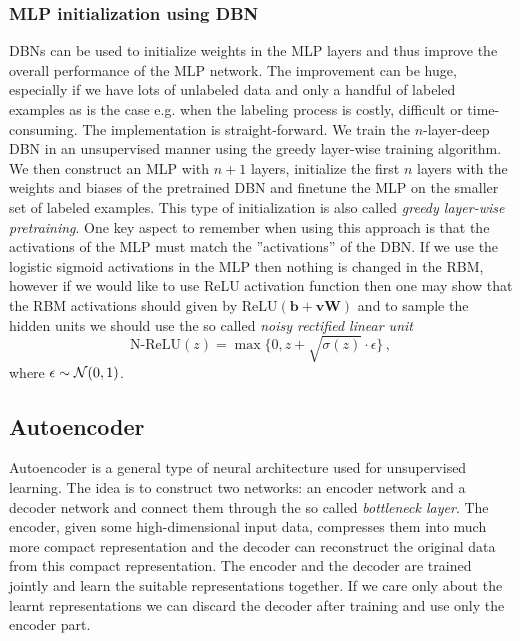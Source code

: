 \documentclass{myclass}
\begin{document}
\subsubsection{MLP initialization using DBN}

DBNs can be used to initialize weights in the MLP layers and thus improve the overall performance of
the MLP network. The improvement can be huge, especially if we have lots of unlabeled data and only
a handful of labeled examples as is the case e.g. when the labeling process is costly, difficult or
time-consuming. The implementation is straight-forward. We train the $n$-layer-deep DBN in an
unsupervised manner using the greedy layer-wise training algorithm. We then construct an MLP with
$n+1$ layers, initialize the first $n$ layers with the weights and biases of the pretrained DBN and
finetune the MLP on the smaller set of labeled examples. This type of initialization is also called
\emph{greedy layer-wise pretraining}. One key aspect to remember when using this approach is that
the activations of the MLP must match the ''activations'' of the DBN. If we use the logistic sigmoid
activations in the MLP then nothing is changed in the RBM, however if we would like to use ReLU
activation function then one may show that the RBM activations should given by $\text{ReLU}(\bm{b} +
\bm{vW})$ and to sample the hidden units we should use the so called \emph{noisy rectified linear
unit} 
\[
   \text{N-ReLU}(z) = \max\{ 0, z + \sqrt{\sigma(z)} \cdot \epsilon\}\,,
\]
where $\epsilon \sim \mathcal{N}(0,1)$.


\subsection{Autoencoder}

Autoencoder is a general type of neural architecture used for unsupervised learning. The idea is to
construct two networks: an encoder network and a decoder network and connect them through the so
called \emph{bottleneck layer}. The encoder, given some high-dimensional input data, compresses them
into much more compact representation and the decoder can reconstruct the original data from this
compact representation. The encoder and the decoder are trained jointly and learn the suitable
representations together. If we care only about the learnt representations we can discard the
decoder after training and use only the encoder part.
\end{document}
